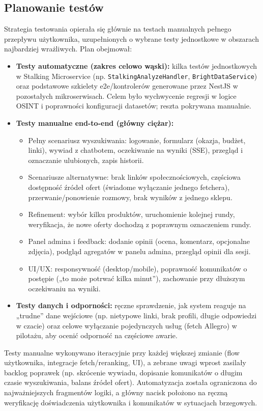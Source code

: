 \documentclass[12pt,a4paper]{article}
\begin{document}
\subsection{Planowanie testów}
Strategia testowania opierała się głównie na testach manualnych pełnego przepływu użytkownika, uzupełnionych o wybrane testy jednostkowe w obszarach najbardziej wrażliwych. Plan obejmował:
\begin{itemize}
    \item \textbf{Testy automatyczne (zakres celowo wąski):} kilka testów jednostkowych w Stalking Microservice (np. \texttt{StalkingAnalyzeHandler}, \texttt{BrightDataService}) oraz podstawowe szkielety e2e/kontrolerów generowane przez NestJS w pozostałych mikroserwisach. Celem było wychwycenie regresji w logice OSINT i poprawności konfiguracji datasetów; reszta pokrywana manualnie.
    \item \textbf{Testy manualne end-to-end (główny ciężar):}
    \begin{itemize}
        \item Pełny scenariusz wyszukiwania: logowanie, formularz (okazja, budżet, linki), wywiad z chatbotem, oczekiwanie na wyniki (SSE), przegląd i oznaczanie ulubionych, zapis historii.
        \item Scenariusze alternatywne: brak linków społecznościowych, częściowa dostępność źródeł ofert (świadome wyłączanie jednego fetchera), przerwanie/ponowienie rozmowy, brak wyników z jednego sklepu.
        \item Refinement: wybór kilku produktów, uruchomienie kolejnej rundy, weryfikacja, że nowe oferty dochodzą z poprawnym oznaczeniem rundy.
        \item Panel admina i feedback: dodanie opinii (ocena, komentarz, opcjonalne zdjęcia), podgląd agregatów w panelu admina, przegląd opinii dla sesji.
        \item UI/UX: responsywność (desktop/mobile), poprawność komunikatów o postępie („to może potrwać kilka minut”), zachowanie przy dłuższym oczekiwaniu na wyniki.
    \end{itemize}
    \item \textbf{Testy danych i odporności:} ręczne sprawdzenie, jak system reaguje na „trudne” dane wejściowe (np. nietypowe linki, brak profili, długie odpowiedzi w czacie) oraz celowe wyłączanie pojedynczych usług (fetch Allegro) w pilotażu, aby ocenić odporność na częściowe awarie.
\end{itemize}
Testy manualne wykonywano iteracyjnie przy każdej większej zmianie (flow użytkownika, integracje fetch/reranking, UI), a zebrane uwagi wprost zasilały backlog poprawek (np. skrócenie wywiadu, dopisanie komunikatów o długim czasie wyszukiwania, balans źródeł ofert). Automatyzacja została ograniczona do najważniejszych fragmentów logiki, a główny nacisk położono na ręczną weryfikację doświadczenia użytkownika i komunikatów w sytuacjach brzegowych.
\end{document}
